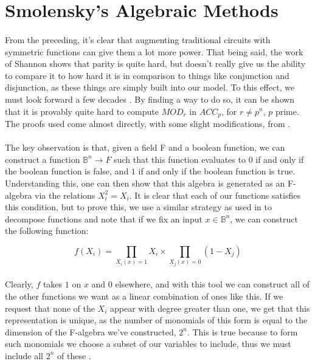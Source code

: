\documentclass{article}
\begin{document}
\section*{Smolensky's Algebraic Methods}

\paragraph*{}
  From the preceding, it's clear that augmenting traditional circuits with symmetric functions
can give them a lot more power. That being said, the work of Shannon shows that parity 
is quite hard, but doesn't really give us the ability to compare it to how hard it is in comparison
to things like conjunction and disjunction, as these things are simply built into our model. To
this effect, we must look forward a few decades \cite{Smolensky1987} \cite{Razborov1985}. By 
finding a way to do so, it can be shown that it is provably quite hard to compute $MOD_r$ 
in $ACC_p$, for $r \neq p^n$, $p$ prime. The proofs used come almost directly, with some slight
modifications, from \cite{Smolensky1987}.

\paragraph*{}
  The key observation is that, given a field F and a boolean function, we can construct a function
$\mathbb{B}^n \rightarrow F$ such that this function evaluates to $0$ if and only if the boolean
function is false, and $1$ if and only if the boolean function is true. Understanding this, one
can then show that this algebra is generated as an F-algebra via the relations $X_i^2 = X_i$.
It is clear that each of our functions satisfies this condition, but to prove this, we use a
similar strategy as used in \cite{Shannon1938} to decompose functions and note that if we fix 
an input $x \in \mathbb{B}^n$, we can construct the following function:

\[f(X_i) = \prod_{X_i(x) = 1} X_i \times \prod_{X_j(x) = 0} (1 - X_j)\]

\paragraph*{}
  Clearly, $f$ takes $1$ on $x$ and $0$ elsewhere, and with this tool we can construct all of the
other functions we want as a linear combination of ones like this. If we request that none of the
$X_i$ appear with degree greater than one, we get that this representation is unique, as the number
of monomials of this form is equal to the dimension of the F-algebra we've constructed, $2^n$. This
is true because to form such monomials we choose a subset of our variables to include, thus we must
include all $2^n$ of these \cite{Smolensky1987}.
\end{document}
